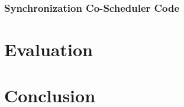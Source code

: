\documentclass[ms,electronic,double]{nuthesis}
\begin{document}
\subsection{Synchronization Co-Scheduler Code}

\chapter{Evaluation}

\chapter{Conclusion}


\backmatter

\appendix




\nocite{*}

\end{document}
